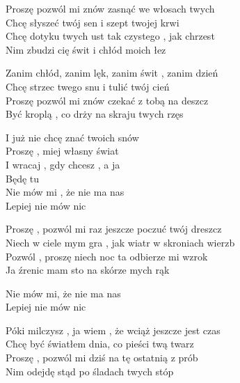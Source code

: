 \begin{text}
    Proszę pozwól mi znów zasnąć we włosach twych\\
    Chcę słyszeć twój sen i szept twojej krwi\\
    Chcę dotyku twych ust tak czystego , jak chrzest\\
    Nim zbudzi cię świt i chłód moich łez

    Zanim chłód, zanim lęk, zanim świt , zanim dzień\\
    Chcę strzec twego snu i tulić twój cień\\
    Proszę pozwól mi znów czekać z tobą na deszcz\\
    Być kroplą , co drży na skraju twych rzęs

    I już nie chcę znać twoich snów\\
    Proszę , miej własny świat\\
    I wracaj , gdy chcesz , a ja\\
    Będę tu\\
    Nie mów mi , że nie ma nas\\
    Lepiej nie mów nic

    Proszę , pozwól mi raz jeszcze poczuć twój dreszcz\\
    Niech w ciele mym gra , jak wiatr w skroniach wierzb\\
    Pozwól , proszę niech noc ta odbierze mi wzrok\\
    Ja źrenic mam sto na skórze mych rąk

    Nie mów mi, że nie ma nas\\
    Lepiej nie mów nic

    Póki milczysz , ja wiem , że wciąż jeszcze jest czas\\
    Chcę być światłem dnia, co pieści twą twarz\\
    Proszę , pozwól mi dziś na tę ostatnią z prób\\
    Nim odejdę stąd po śladach twych stóp
\end{text}
\begin{chord}

\end{chord}